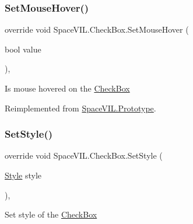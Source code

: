 \mbox{\label{class_space_v_i_l_1_1_check_box_a25dadac18b060b665065ddc3cb6b91bd}} 
\subsubsection{\texorpdfstring{Set\+Mouse\+Hover()}{SetMouseHover()}}
{\footnotesize\ttfamily override void Space\+V\+I\+L.\+Check\+Box.\+Set\+Mouse\+Hover (\begin{DoxyParamCaption}\item[{bool}]{value }\end{DoxyParamCaption})\hspace{0.3cm}{\ttfamily [inline]}, {\ttfamily [virtual]}}



Is mouse hovered on the \mbox{\hyperlink{class_space_v_i_l_1_1_check_box}{Check\+Box}} 



Reimplemented from \mbox{\hyperlink{class_space_v_i_l_1_1_prototype}{Space\+V\+I\+L.\+Prototype}}.

\mbox{\label{class_space_v_i_l_1_1_check_box_a123c8ba848fb10601c5ee80681410f23}} 
\subsubsection{\texorpdfstring{Set\+Style()}{SetStyle()}}
{\footnotesize\ttfamily override void Space\+V\+I\+L.\+Check\+Box.\+Set\+Style (\begin{DoxyParamCaption}\item[{\mbox{\hyperlink{class_space_v_i_l_1_1_decorations_1_1_style}{Style}}}]{style }\end{DoxyParamCaption})\hspace{0.3cm}{\ttfamily [inline]}, {\ttfamily [virtual]}}



Set style of the \mbox{\hyperlink{class_space_v_i_l_1_1_check_box}{Check\+Box}} 



